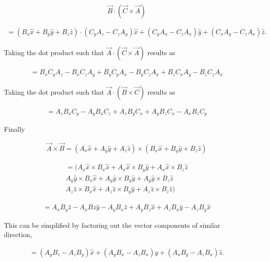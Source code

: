 \documentclass[11pt]{article}
\begin{document}
$$
\vec{B} \cdot (\vec{C} \times \vec{A}) 
$$

\begin{eqnarray*}
= (B_{x}\hat{x} + B_{y}\hat{y} + B_{z}\hat{z}) \cdot
(C_{y}A_{z} - C_{z}A_{y})\hat{x} 
+ (C_{y}A_{x} - C_{z}A_{x})\hat{y}
+ (C_{x}A_{y} - C_{z}A_{x})\hat{z}.
\end{eqnarray*}

Taking the dot product such that $\vec{A} \cdot (\vec{C} \times \vec{A})$
results as
    
\begin{eqnarray*}
= B_{x}C_{y}A_{z} - B_{x}C_{z}A_{y} + B_{y}C_{y}A_{x} 
- B_{y}C_{z}A_{x} + B_{z}C_{x}A_{y} - B_{z}C_{z}A_{x}
\end{eqnarray*}


Taking the dot product such that $\vec{A} \cdot (\vec{B} \times \vec{C})$
results as
    
\begin{eqnarray*}
= A_{z}B_{x}C_{y} - A_{y}B_{x}C_{z} + A_{z}B_{y}C_{x} + A_{y}B_{z}C_{x} - A_{x}B_{z}C_{y}
\end{eqnarray*}


Finally

\begin{eqnarray*}
\vec{A} \times \vec{B} = 
(A_{x}\hat{x} + A_{y}\hat{y} + A_{z}\hat{z}) \times
(B_{x}\hat{x} + B_{y}\hat{y} + B_{z}\hat{z}) 
\end{eqnarray*}

\begin{eqnarray*}
= ( 
A_{x}\hat{x} \times B_{x}\hat{x} + A_{x}\hat{x} \times B_{y}\hat{y} + A_{x}\hat{x} \times B_{z}\hat{z} \\
A_{y}\hat{y} \times B_{x}\hat{x} + A_{y}\hat{y} \times B_{y}\hat{y} + A_{y}\hat{y} \times B_{z}\hat{z} \\
A_{z}\hat{z} \times B_{x}\hat{x} + A_{z}\hat{z} \times B_{y}\hat{y} + A_{z}\hat{z} \times B_{z}\hat{z} 
) 
\end{eqnarray*}

\begin{eqnarray*}
= A_{x}B_{y}\hat{z} - A_{x}B{z}\hat{y} 
- A_{y}B_{x}\hat{z} + A_{y}B_{z}\hat{x} 
+ A_{z}B_{x}\hat{y} - A_{z}B_{y}\hat{x}
\end{eqnarray*}

This can be simplified by factoring out the vector components of similar direction,

\begin{eqnarray*}
= (A_{y}B_{z} - A_{z}B_{y})\hat{x} 
+ (A_{y}B_{x} - A_{z}B_{x})\hat{y}
+ (A_{x}B_{y} - A_{z}B_{x})\hat{z}.
\end{eqnarray*}
\end{document}
